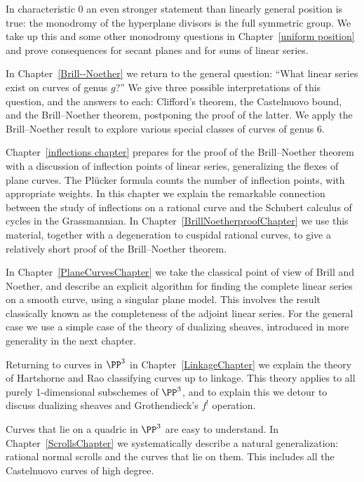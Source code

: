 In characteristic 0 an even stronger statement than linearly general position is true: the monodromy of the hyperplane divisors is the full symmetric group. We take up this
and some other monodromy questions in Chapter~\ref{uniform position} and prove consequences
for secant planes and for sums of linear series.

In Chapter~\ref{Brill--Noether} we return to the general question:
``What linear series exist on curves of genus $g$?'' We give three
possible interpretations of this question, and the answers to each:
Clifford's theorem, the Castelnuovo bound, and the Brill--Noether
theorem, postponing the proof of the latter.
We apply the Brill--Noether result to explore  various special classes of curves of genus 6.

Chapter~\ref{inflections chapter} prepares for the proof of the Brill--Noether theorem 
with a discussion of inflection points of linear series, generalizing the flexes of plane curves. The Pl\"ucker formula
counts the number of inflection points, with appropriate weights. In this chapter we explain
the remarkable connection between the study of inflections on a rational curve and the Schubert calculus of cycles in the Grassmannian. In Chapter~\ref{BrillNoetherproofChapter} we use this material, together with a degeneration to cuspidal rational curves, to give a relatively short proof of the Brill--Noether theorem.

In Chapter~\ref{PlaneCurvesChapter} we take the classical point of view of Brill and Noether,
and describe an explicit algorithm for finding the complete linear series on a smooth curve, using a singular plane model. This involves the result classically known as the completeness of the adjoint linear series. For the general case we use a simple case of the theory of dualizing sheaves, introduced in more generality in the next chapter.

Returning to curves in $\PP^{3}$ in Chapter~\ref{LinkageChapter} we explain the theory of Hartshorne and Rao classifying curves up to linkage. This theory applies to all purely 1-dimensional subschemes of $\PP^{3}$, and to explain this
we detour to discuss dualizing sheaves and Grothendieck's $f^{!}$ operation.

Curves that lie on a quadric in $\PP^3$ are easy to understand. In Chapter~\ref{ScrollsChapter} we systematically describe a natural generalization: rational normal scrolls and the curves that lie on them. This includes all the Castelnuovo curves of high degree. 

